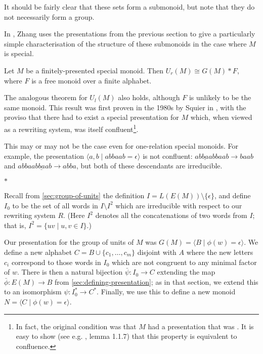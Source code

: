 \documentclass[noindex,noinsetproof,emphthm,12pt]{lmaths}
\newcommand{\paradec}{\par\begin{center}$\ast$\end{center}}
\begin{document}
It should be fairly clear that these sets form a submonoid, but note that they do not necessarily form a group.

In \cite{Zhang1992a}, Zhang uses the presentations from the previous section to give a particularly simple characterisation of the structure of these submonoids in the case where $M$ is special.
\begin{theorem} \label{thm:gen-units-factor-freely}
	Let $M$ be a finitely-presented special monoid. Then $U_r(M) \cong G(M) \ast F$, where $F$ is a free monoid over a finite alphabet.
\end{theorem}

The analogous theorem for $U_l(M)$ also holds, although $F$ is unlikely to be the same monoid. This result was first proven in the 1980s by Squier in \cite{Squier1987}, with the proviso that there had to exist a special presentation for $M$ which, when viewed as a rewriting system, was itself confluent\footnote{In fact, the original condition was that $M$ had a presentation that was . It is easy to show (see e.g. \cite{Book1993}, lemma 1.1.7) that this property is equivalent to confluence.}.

This may or may not be the case even for one-relation special monoids. For example, the presentation $\langle a, b \mid abbaab = \epsilon\rangle$ is not confluent: $\underline{abbaab}baab \to baab$ and $abba\underline{abbaab} \to abba$, but both of these descendants are irreducible.

\paradec

Recall from \cref{sec:group-of-units} the definition $I = L(E(M)) \setminus \{\epsilon\}$, and define $I_0$ to be the set of all words in $I \setminus I^2$ which are irreducible with respect to our rewriting system $R$. (Here $I^2$ denotes all the concatenations of two words from $I$; that is, $I^2 = \{ uv \mid u, v \in I \}$.)

Our presentation for the group of units of $M$ was $G(M) = \langle B \mid \phi(w) = \epsilon \rangle$. We define a new alphabet $C = B \cup \{c_1, \ldots, c_m\}$ disjoint with $A$ where the new letters $c_i$ correspond to those words in $I_0$ which are not congruent to any minimal factor of $w$. There is then a natural bijection $\bar\psi : I_0 \to C$ extending the map $\bar\phi : E(M) \to B$ from \cref{sec:defining-presentation}; as in that section, we extend this to an isomorphism $\psi : I_0^* \to C^*$. Finally, we use this to define a new monoid $N = \langle C \mid \phi(w) = \epsilon\rangle$.
\end{document}
